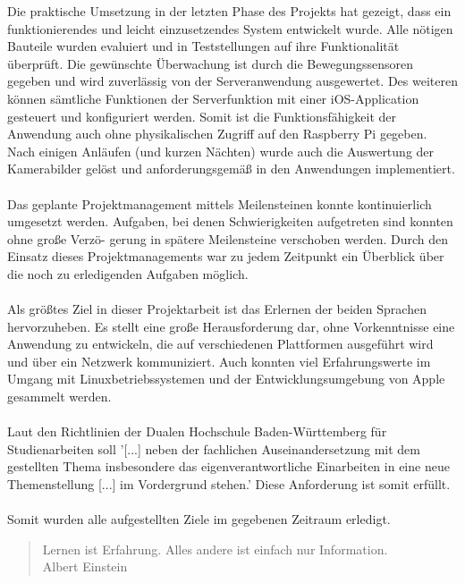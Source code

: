 Die praktische Umsetzung in der letzten Phase des Projekts hat gezeigt, dass ein funktionierendes und leicht einzusetzendes System entwickelt wurde. Alle nötigen Bauteile wurden evaluiert und in Teststellungen auf ihre Funktionalität überprüft. Die gewünschte Überwachung ist durch die Bewegungssensoren gegeben und wird zuverlässig von der Serveranwendung ausgewertet. Des weiteren können sämtliche Funktionen der Serverfunktion mit einer iOS-Application gesteuert und konfiguriert werden. Somit ist die Funktionsfähigkeit der Anwendung auch ohne physikalischen Zugriff auf den Raspberry Pi gegeben. Nach einigen Anläufen (und kurzen Nächten) wurde auch die Auswertung der Kamerabilder gelöst und anforderungsgemäß in den Anwendungen implementiert.  \\\\
Das geplante Projektmanagement mittels Meilensteinen konnte kontinuierlich umgesetzt werden. Aufgaben, bei denen Schwierigkeiten aufgetreten sind konnten ohne große Verzö- gerung in spätere Meilensteine verschoben werden. Durch den Einsatz dieses Projektmanagements war zu jedem Zeitpunkt ein Überblick über die noch zu erledigenden Aufgaben möglich. \\\\
Als größtes Ziel in dieser Projektarbeit ist das Erlernen der beiden Sprachen hervorzuheben. Es stellt eine große Herausforderung dar, ohne Vorkenntnisse eine Anwendung zu entwickeln, die auf verschiedenen Plattformen ausgeführt wird und über ein Netzwerk kommuniziert. Auch konnten viel Erfahrungswerte im Umgang mit Linuxbetriebssystemen und der Entwicklungsumgebung von Apple gesammelt werden.\\\\
Laut den Richtlinien der Dualen Hochschule Baden-Württemberg für Studienarbeiten soll '[...] neben der fachlichen Auseinandersetzung mit dem
gestellten Thema insbesondere das eigenverantwortliche Einarbeiten in eine neue Themenstellung [...] im Vordergrund stehen.' \cite{dhbw} Diese Anforderung ist somit erfüllt.\\\\
Somit wurden alle aufgestellten Ziele im gegebenen Zeitraum erledigt.\\
\begin{quote}
	\centering
	Lernen ist Erfahrung. Alles andere ist einfach nur Information. \\
	Albert Einstein
\end{quote}